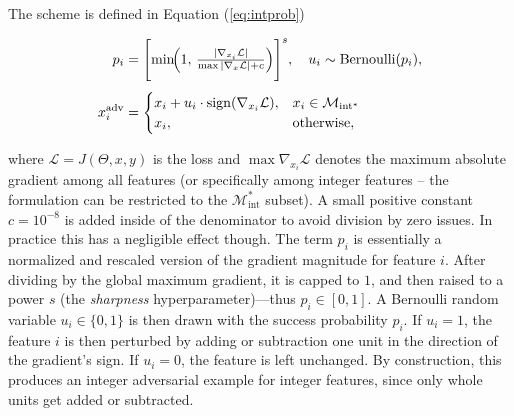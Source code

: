 The scheme is defined in Equation (\ref{eq:intprob})

\begin{equation}
\begin{aligned}
p_i &= \Biggl[\min\!\Bigl(1,\,
          \tfrac{|\nabla_{x_i}\mathcal{L}|}{\max|\nabla_{x}\mathcal{L}|+c}\Bigr)\Biggr]^{s}, \quad
u_i \sim \operatorname{Bernoulli}(p_i), \\[4pt]
x_i^{\text{adv}} &= 
    \begin{cases} 
    x_i + u_i\cdot \operatorname{sign}(\nabla_{x_i} \mathcal{L}), & x_i\in\mathcal{M}_{\text{int}^*} \\
    x_i, & \text{otherwise},
    \end{cases}
\end{aligned}
\label{eq:intprob}
\end{equation}

where $\mathcal{L}=J(\Theta,x,y)$ is the loss and $\max{\nabla_{x_i} \mathcal{L}}$ denotes the maximum absolute gradient among all features (or specifically among integer features – the formulation can be restricted to the $\mathcal{M}_{\text{int}}^*$ subset). A small positive constant $c=10^{-8}$ is added inside of the denominator to avoid division by zero issues. In practice this has a negligible effect though. The term $p_i$ is essentially a normalized and rescaled version of the gradient magnitude for feature $i$. After dividing by the global maximum gradient, it is capped to $1$, and then raised to a power $s$ (the \textit{sharpness} hyperparameter)—thus $p_i \in [0,1]$. A Bernoulli random variable $u_i\in\{0,1\}$ is then drawn with the success probability $p_i$. If $u_i=1$, the feature $i$ is then perturbed by adding or subtraction one unit in the direction of the gradient's sign. If $u_i=0$, the feature is left unchanged. By construction, this produces an integer adversarial example for integer features, since only whole units get added or subtracted.

